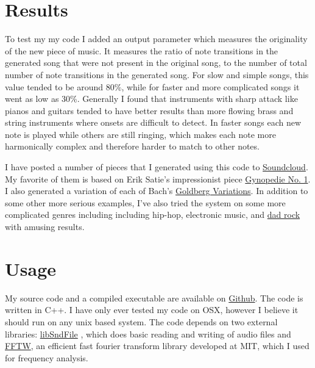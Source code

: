 \documentclass{amsart}
\theoremstyle{definition}
\begin{document}
\section{Results}

To test my my code I added an output parameter which measures the originality of the new piece of music.
It measures the ratio of note transitions in the generated song that were not present in the original song,
to the number of total number of note transitions in the generated song.
For slow and simple songs, this value tended to be around $80\%$, while for 
faster and more complicated songs it went as low as 30\%.
Generally I found that instruments with sharp attack like pianos and guitars tended to have better results than more flowing
brass and string instruments where onsets are difficult to detect.
In faster songs each new note is played while others are still ringing,
which makes each note more harmonically complex and therefore harder to match to other notes.

I have posted a number of pieces that I generated using this code to 
\href{https://soundcloud.com/user-12541400}{Soundcloud}.
My favorite of them is based on Erik Satie's impressionist piece 
\href{https://soundcloud.com/user-12541400/gymnopedie-no1}{Gynopedie No. 1}.
I also generated a variation of each of Bach's 
\href{https://soundcloud.com/user-12541400/sets/goldberg-variations-variations}{Goldberg Variations}.
In addition to some other more serious examples, I've also tried the system on some more complicated genres including 
including hip-hop, electronic music, and
\href{https://soundcloud.com/user-12541400/carry-on-wayward-son}{dad rock}
with amusing results.


\section{Usage}

My source code and a compiled executable are available on 
\href{
https://github.com/sportdeath/N-Gram-Music
}{Github}.
The code is written in C++.
I have only ever tested my code on OSX, however I believe it should run on any unix based system.
The code depends on two external libraries: 
\href{http://www.mega-nerd.com/libsndfile/}{libSndFile}\cite{libSndFile}
, which does basic reading and writing of audio files
and
\href{http://www.fftw.org}{FFTW}\cite{fftw}, an efficient fast fourier transform library developed at MIT, which I used for frequency analysis.
\end{document}
